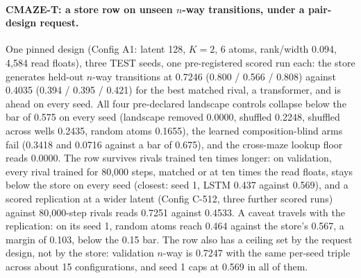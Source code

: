 \documentclass{article} %
\begin{document}
\paragraph{CMAZE-T: a store row on unseen $n$-way transitions, under a pair-design request.} One pinned design (Config A1:
latent 128, $K=2$, 6 atoms, rank/width 0.094, 4,584 read floats), three TEST seeds, one pre-registered scored run each: the store generates held-out $n$-way transitions at 0.7246 (0.800 / 0.566 / 0.808) against
0.4035 (0.394 / 0.395 / 0.421) for the best matched rival, a transformer, and is ahead on every
seed. All four pre-declared landscape controls collapse below the bar of 0.575 on every seed (landscape removed
0.0000, shuffled 0.2248, shuffled across wells 0.2435, random atoms 0.1655), the learned
composition-blind arms fail (0.3418 and 0.0716 against a bar of 0.675), and the cross-maze lookup
floor reads 0.0000. The row survives rivals trained ten times longer: on validation, every rival
trained for 80,000 steps, matched or at ten times the read floats, stays below the store on every
seed (closest: seed 1, LSTM 0.437 against 0.569), and a scored replication at a wider latent (Config
C-512, three further scored runs) against 80,000-step rivals reads 0.7251 against 0.4533. A caveat travels with the
replication: on its seed 1, random atoms reach 0.464 against the store's 0.567, a margin of 0.103,
below the 0.15 bar. The row also has a ceiling set by the request design, not by the store:
validation $n$-way is 0.7247 with the same per-seed triple across about 15 configurations, and
seed 1 caps at 0.569 in all of them.

\end{document}
